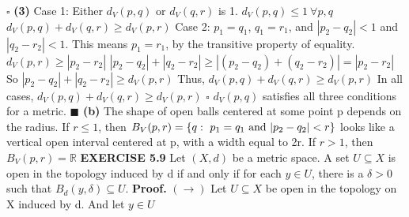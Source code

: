 \documentclass[12pt]{article}
\begin{document}
  \newline \(\square\) \newline
  \textbf{(3)}
  Case 1: Either \(d_V(p,q)\) or \(d_V(q,r)\) is 1.
  \newline
  \(d_V(p,q) \leq 1\ \forall p,q\)
  \newline
  \(d_V(p,q) + d_V(q,r) \geq d_V(p,r)\)
  \newline \newline
  Case 2: \(p_1 = q_1\), \(q_1 = r_1\), and \(|p_2-q_2| < 1\) and \(|q_2-r_2| < 1\).
  \newline
  This means \(p_1 = r_1\), by the transitive property of equality.
  \newline
  \(d_V(p,r) \geq |p_2 - r_2|\)
  \newline
  \(|p_2-q_2| + |q_2-r_2| \geq |(p_2-q_2) + (q_2-r_2)| = |p_2 - r_2|\)
  \newline
  So \(|p_2-q_2| + |q_2-r_2| \geq d_V(p,r)\)
  \newline
  Thus, \(d_V(p,q) + d_V(q,r) \geq d_V(p,r)\)
  \newline \newline
  In all cases, \(d_V(p,q) + d_V(q,r) \geq d_V(p,r)\)
  \newline \(\square\) \newline
  \(d_V(p,q)\) satisfies all three conditions for a metric.
  \newline \(\blacksquare\) \newline
  \textbf{(b)} The shape of open balls centered at some point p depends on the radius.
  \newline \newline
  If \(r \leq 1\), then \(B_V(p,r) = \{q:\ p_1 = q_1 \textup{ and }|p_2-q_2| < r\}\) looks like a vertical open interval centered at p, with a width equal to 2r.
  \newline \newline
  If \(r > 1\), then \(B_V(p,r) = \mathbb{R}\)
  \newpage
  \noindent
  \textbf{EXERCISE 5.9}
  \newline
  Let \((X,d)\) be a metric space. A set \(U \subseteq X\) is open in the topology induced by d if and only if for each \(y \in U\), there is a \(\delta > 0\) such that \(B_d(y,\delta) \subseteq U\).
  \newline
  \newline
  \textbf{Proof.}
  \newline
  \((\rightarrow)\)
  Let \(U \subseteq X\) be open in the topology on X induced by d. And let \(y \in U\)
  \newline \newline
\end{document}

